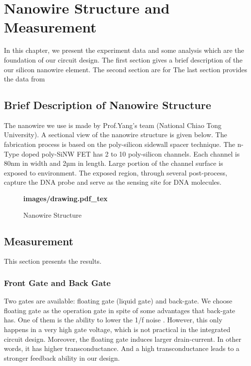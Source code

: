 \chapter{Nanowire Structure and Measurement}
In this chapter, we present the experiment data and some analysis which are the foundation of our circuit design.
The first section gives a brief description of the our silicon nanowire element.
The second section are for %
The last section provides the data from %
\section{Brief Description of Nanowire Structure}
The nanowire we use is made by Prof.Yang's team (National Chiao Tong University)\cite{C5}.
A sectional view of the nanowire structure is given below.
The fabrication process is based on the poly-silicon sidewall spacer technique.
The n-Type doped poly-SiNW FET has 2 to 10 poly-silicon channels.
Each channel is 80nm in width and 2µm in length.
Large portion of the channel surface is exposed to environment.
The exposed region, through several post-process, capture the DNA probe and serve as the sensing site for DNA molecules.\cite{C5, C6}

\begin{figure}[!htbp]
    \centering
    {\selectfont\textbf{
        \def\svgwidth{5.0cm}
        \fontsize{6}{7}\selectfont
         {images/drawing.pdf_tex}
    }}
    \fontsize{6}{7}\selectfont
    \caption{Nanowire Structure}
    \label{fig:drawing}
\end{figure}



\section{Measurement}
This section presents the results.

\subsection*{Front Gate and Back Gate}
Two gates are available: floating gate (liquid gate) and back-gate.
We choose floating gate as the operation gate in spite of some advantages that back-gate has.
One of them is the ability to lower the 1/f noise \cite{C7, C8}.
However, this only happens in a very high gate voltage, which is not practical in the integrated circuit design.
Moreover, the floating gate induces larger drain-current.
In other words, it has higher transconductance. And a high transconductance leads to a stronger feedback ability in our design.

